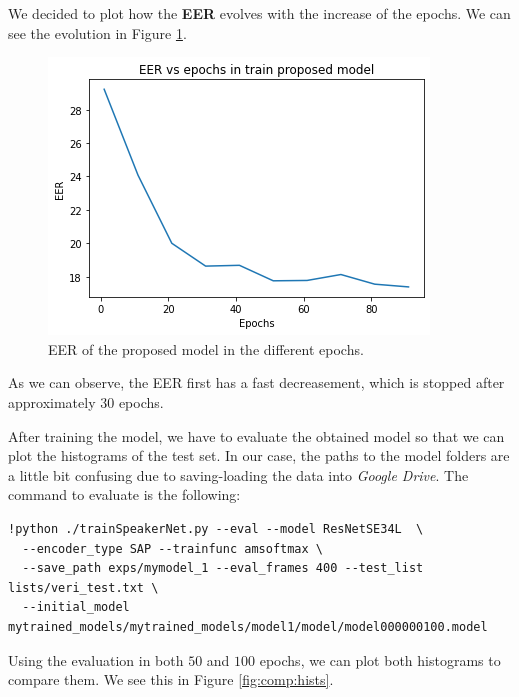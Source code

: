\documentclass[a4paper]{article}
\begin{document}
We decided to plot how the \textbf{EER} evolves with the increase of the epochs. We can see the evolution in Figure \ref{fig:eer:evolution}.

\begin{figure}[H]
  \centering
  \includegraphics[scale=0.8]{Figures/proposed_model_eer}
  \caption{EER of the proposed model in the different epochs.}
  \label{fig:eer:evolution}
\end{figure}

As we can observe, the EER first has a fast decreasement, which is stopped after approximately \(30\) epochs.

After training the model, we have to evaluate the obtained model so that we can plot the histograms of the test set. In our case, the paths to the model folders are a little bit confusing due to saving-loading the data into \emph{Google Drive}. The command to evaluate is the following:

\begin{verbatim}
!python ./trainSpeakerNet.py --eval --model ResNetSE34L  \
  --encoder_type SAP --trainfunc amsoftmax \
  --save_path exps/mymodel_1 --eval_frames 400 --test_list lists/veri_test.txt \
  --initial_model mytrained_models/mytrained_models/model1/model/model000000100.model
\end{verbatim}

Using the evaluation in both \(50\) and \(100\) epochs, we can plot both histograms to compare them. We see this in Figure \ref{fig:comp:hists}.
\end{document}
